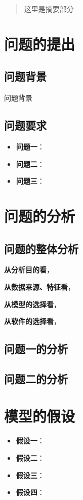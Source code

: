 \documentclass{MathorCupModeling}
\begin{document}
	\begin{abstract}
		这里是摘要部分
	\end{abstract}

	\pagestyle{empty}
	\tableofcontents
	\newpage
	\pagestyle{fancy}

	\setcounter{page}{1}
	\section{问题的提出}
	\subsection{问题背景}
	问题背景
	\subsection{问题要求}
	\begin{itemize}
		\item \textbf{问题一}：
		\item \textbf{问题二}：
		\item \textbf{问题三}：
	\end{itemize}

	\section{问题的分析}
	\subsection{问题的整体分析}

	\textbf{从分析目的看}，

	\textbf{从数据来源、特征看}，
	
	\textbf{从模型的选择看}，

	\textbf{从软件的选择看}，
	
	\subsection{问题一的分析}

	\subsection{问题二的分析}

	\section{模型的假设}
	\begin{itemize}
		\item \textbf{假设一}：
		\item \textbf{假设二}：
		\item \textbf{假设三}：
		\item \textbf{假设四}：
	\end{itemize}
\end{document}
